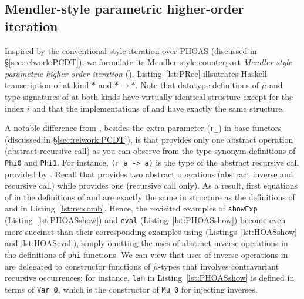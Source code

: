 \subsection{Mendler-style parametric higher-order iteration}
\label{sec:ongoing:mphit}
Inspired by the conventional style iteration over PHOAS \cite{BahHvi12}
(discussed in \S\ref{sec:relwork:PCDT}), we formulate its Mendler-style
counterpart \emph{Mendler-style parametric higher-order iteration} (\mphit{}).
Listing~\ref{lst:PRec} illsutrates Haskell transcription of \mphit{}
at kind $*$ and $*\to*$. Note that datatype definitions of $\hat\mu$ and
type signatures of \mphit{} at both kinds have virtually identical structure
except for the index $i$ and that the implementations of \mphit{*} and
\mphit{*\to*} have exactly the same structure.

\begin{figure}

\vspace*{-3ex}
\end{figure}

A notable difference from \msfit{},
besides the extra parameter (\lstinline{r_}) in base functors
(discussed in \S\ref{sec:relwork:PCDT}), is that \mphit{} provides only one
abstract operation (abstract recursive call) as you can observe from
the type synonym definitions of \lstinline{Phi0} and \lstinline{Phi1}.
For instance, \lstinline{(r a -> a)} is the type of
the abstract recursive call provided by \mphit{*}.
Recall that \msfit{} provides two abstract operations (abstract inverse
and recursive call) while \mit{} provides one (recursive call only).
As a result, first equations of \mphit{} in the definitions of \mphit{*} and
\mphit{*\to*} are exactly the same in structure as the definitions of \MIt{*}
and \MIt{*\to*} in Listing~\ref{lst:reccomb}. Hence, the revisited examples of
\lstinline{showExp} (Listing~\ref{lst:PHOASshow}) and \lstinline{eval}
(Listing~\ref{lst:PHOASshow}) become even more succinct than their corresponding
examples using \msfit{} (Listings~\ref{lst:HOASshow} and \ref{lst:HOASeval}),
simply omitting the uses of abstract inverse operations in the definitions
of \lstinline{phi} functions. We can view that uses of inverse operations
in \mphit{} are delegated to constructor functions of $\hat\mu$-types that
involves contravariant recursive occurrences; for instance, \lstinline{lam}
in Listing~\ref{lst:PHOASshow} is defined in terms of \lstinline{Var_0},
which is the constructor of \lstinline{Mu_0} for injecting inverses.

